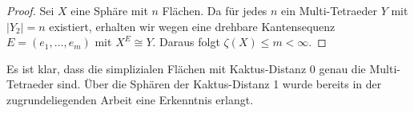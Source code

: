 \documentclass[12pt,titlepage,twoside,cleardoublepage]{article}
\theoremstyle{nummermitklammern}
\numberwithin{equation}{section}
\DeclareMathOperator{\Pot}{Pot}
\begin{document}
\begin{proof}

Sei $X$ eine Sphäre mit $n$ Flächen. Da für jedes $n$ ein  Multi-Tetraeder $Y$ mit $\vert Y_2\vert =n$ existiert, erhalten wir wegen  eine drehbare Kantensequenz $E=(e_1,\ldots,e_m)$ mit $X^E\cong Y$. Daraus folgt $\zeta(X)\leq m<\infty.$ 

\end{proof}
Es ist klar, dass die simplizialen Flächen mit Kaktus-Distanz $0$ genau die Multi-Tetraeder sind. Über die Sphären der Kaktus-Distanz 1 wurde bereits in der zugrundeliegenden Arbeit eine Erkenntnis erlangt.
\end{document}
